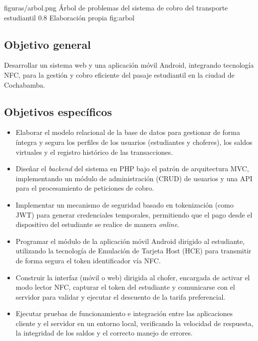 \documentclass[12pt,letterpaper]{report}
\begin{document}
	
	\figuraAPA
	{figuras/arbol.png}
	{Árbol de problemas del sistema de cobro del transporte estudiantil}
	{0.8\textwidth}
	{Elaboración propia}
	{fig:arbol}
	
	\subsection{Objetivo general}
	
	Desarrollar un sistema web y una aplicación móvil Android, integrando tecnología NFC, para la gestión y cobro eficiente del pasaje estudiantil en la ciudad de Cochabamba.
	
	\subsection{Objetivos específicos}
	
	\begin{itemize}
		\item Elaborar el modelo relacional de la base de datos para gestionar de forma íntegra y segura los perfiles de los usuarios (estudiantes y choferes), los saldos virtuales y el registro histórico de las transacciones.
		
		\item Diseñar el \textit{backend} del sistema en PHP bajo el patrón de arquitectura MVC, implementando un módulo de administración (CRUD) de usuarios y una API para el procesamiento de peticiones de cobro.
		
		\item Implementar un mecanismo de seguridad basado en tokenización (como JWT) para generar credenciales temporales, permitiendo que el pago desde el dispositivo del estudiante se realice de manera \textit{online}.
		
		\item Programar el módulo de la aplicación móvil Android dirigido al estudiante, utilizando la tecnología de Emulación de Tarjeta Host (HCE) para transmitir de forma segura el token identificador vía NFC.
		
		\item Construir la interfaz (móvil o web) dirigida al chofer, encargada de activar el modo lector NFC, capturar el token del estudiante y comunicarse con el servidor para validar y ejecutar el descuento de la tarifa preferencial.
		
		\item Ejecutar pruebas de funcionamiento e integración entre las aplicaciones cliente y el servidor en un entorno local, verificando la velocidad de respuesta, la integridad de los saldos y el correcto manejo de errores.
	\end{itemize}
	
\end{document}

